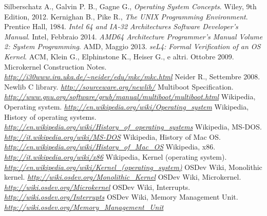 \documentclass[12pt,a4paper]{report}
\begin{document}
\begin{thebibliography}{}
		Silberschatz A., Galvin P. B., Gagne G.,
		\emph{Operating System Concepts}.
		Wiley,
		9th Edition,
		2012.
		Kernighan B., Pike R.,
		\emph{The UNIX Programming Environment}.
		Prentice Hall,
		1984.
		\emph{Intel 64 and IA-32 Architectures Software Developer’s Manual}.
		Intel,
		Febbraio 2014.
		\emph{AMD64 Architecture Programmer’s Manual Volume 2: System Programming}.
		AMD,
		Maggio 2013.
		\emph{seL4: Formal Verification of an OS Kernel}.
		ACM,
		Klein G., Elphinstone K., Heiser G., e altri.
		Ottobre 2009.
		Microkernel Construction Notes.
		\emph{\url{http://i30www.ira.uka.de/~neider/edu/mkc/mkc.html}}
		Neider R.,
		Settembre 2008.
		Newlib C library.
		\emph{\url{http://sourceware.org/newlib/}}
		Multiboot Specification.
		\emph{\url{http://www.gnu.org/software/grub/manual/multiboot/multiboot.html}}
		Wikipedia, Operating system.
		\emph{\url{http://en.wikipedia.org/wiki/Operating_system}}
		Wikipedia, History of operating systems.
		\emph{\url{http://en.wikipedia.org/wiki/History_of_operating_systems}}
		Wikipedia, MS-DOS.
		\emph{\url{http://it.wikipedia.org/wiki/MS-DOS}}
		Wikipedia, History of Mac OS.
		\emph{\url{http://en.wikipedia.org/wiki/History_of_Mac_OS}}
		Wikipedia, x86.
		\emph{\url{http://it.wikipedia.org/wiki/x86}}
		Wikipedia, Kernel (operating system).
		\emph{\url{http://en.wikipedia.org/wiki/Kernel_(operating_system)}}
		OSDev Wiki, Monolithic kernel.
		\emph{\url{http://wiki.osdev.org/Monolithic_Kernel}}
		OSDev Wiki, Microkernel.
		\emph{\url{http://wiki.osdev.org/Microkernel}}
		OSDev Wiki, Interrupts.
		\emph{\url{http://wiki.osdev.org/Interrupts}}
		OSDev Wiki, Memory Management Unit.
		\emph{\url{http://wiki.osdev.org/Memory_Management_Unit}}
\end{thebibliography}
\end{document}
